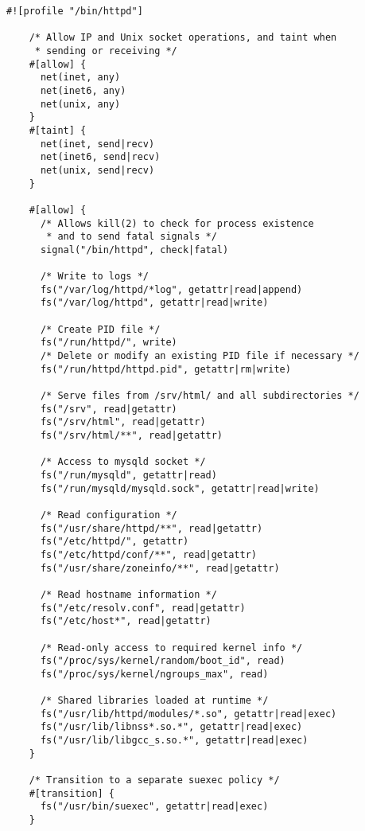 \begin{lstlisting}[language=bpfbox, gobble=4, float=false, caption={[A \bpfbox{} policy for Apache httpd]
  A \bpfbox{} policy for Apache httpd.
  %\todo{Describe this}
}, label={lst:bpfbox-apache}]
    #![profile "/bin/httpd"]

    /* Allow IP and Unix socket operations, and taint when
     * sending or receiving */
    #[allow] {
      net(inet, any)
      net(inet6, any)
      net(unix, any)
    }
    #[taint] {
      net(inet, send|recv)
      net(inet6, send|recv)
      net(unix, send|recv)
    }

    #[allow] {
      /* Allows kill(2) to check for process existence
       * and to send fatal signals */
      signal("/bin/httpd", check|fatal)

      /* Write to logs */
      fs("/var/log/httpd/*log", getattr|read|append)
      fs("/var/log/httpd", getattr|read|write)

      /* Create PID file */
      fs("/run/httpd/", write)
      /* Delete or modify an existing PID file if necessary */
      fs("/run/httpd/httpd.pid", getattr|rm|write)

      /* Serve files from /srv/html/ and all subdirectories */
      fs("/srv", read|getattr)
      fs("/srv/html", read|getattr)
      fs("/srv/html/**", read|getattr)

      /* Access to mysqld socket */
      fs("/run/mysqld", getattr|read)
      fs("/run/mysqld/mysqld.sock", getattr|read|write)

      /* Read configuration */
      fs("/usr/share/httpd/**", read|getattr)
      fs("/etc/httpd/", getattr)
      fs("/etc/httpd/conf/**", read|getattr)
      fs("/usr/share/zoneinfo/**", read|getattr)

      /* Read hostname information */
      fs("/etc/resolv.conf", read|getattr)
      fs("/etc/host*", read|getattr)

      /* Read-only access to required kernel info */
      fs("/proc/sys/kernel/random/boot_id", read)
      fs("/proc/sys/kernel/ngroups_max", read)

      /* Shared libraries loaded at runtime */
      fs("/usr/lib/httpd/modules/*.so", getattr|read|exec)
      fs("/usr/lib/libnss*.so.*", getattr|read|exec)
      fs("/usr/lib/libgcc_s.so.*", getattr|read|exec)
    }

    /* Transition to a separate suexec policy */
    #[transition] {
      fs("/usr/bin/suexec", getattr|read|exec)
    }
\end{lstlisting}

